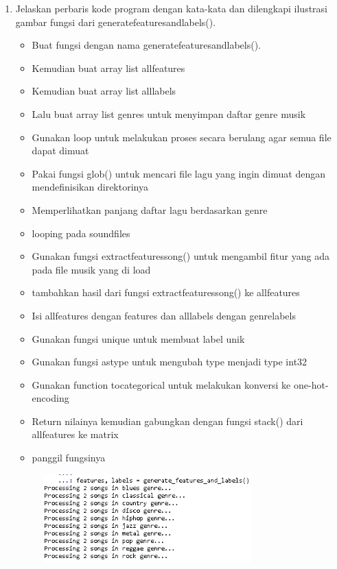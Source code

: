 \begin{enumerate}
	\item Jelaskan perbaris kode program dengan kata-kata dan dilengkapi ilustrasi gambar fungsi dari generatefeaturesandlabels().
	\hfill\break
	
	\begin{itemize}
		\item Buat fungsi dengan nama generatefeaturesandlabels().
		\item Kemudian buat array list allfeatures
		\item Kemudian buat array list alllabels
		\item Lalu buat array list genres untuk menyimpan daftar genre musik
		\item Gunakan loop untuk melakukan proses secara berulang agar semua file dapat dimuat
		\item Pakai fungsi glob() untuk mencari file lagu yang ingin dimuat dengan mendefinisikan direktorinya
		\item Memperlihatkan panjang daftar lagu berdasarkan genre
		\item looping pada soundfiles
		\item Gunakan fungsi extractfeaturessong() untuk mengambil fitur yang ada pada file musik yang di load
		\item tambahkan hasil dari fungsi extractfeaturessong() ke allfeatures
		\item Isi allfeatures dengan features dan alllabels dengan genrelabels
		\item Gunakan fungsi unique untuk membuat label unik
		\item Gunakan fungsi astype untuk mengubah type menjadi type int32
		\item Gunakan function tocategorical untuk melakukan konversi ke one-hot-encoding
		\item Return nilainya kemudian gabungkan dengan fungsi stack() dari allfeatures ke matrix
		\item panggil fungsinya
	\end{itemize}
	\hfill\break
	\begin{figure}[H]
		\includegraphics[width=8cm]{figures/1174079/6/4.png}
		\centering

\end{figure}
\end{enumerate}

